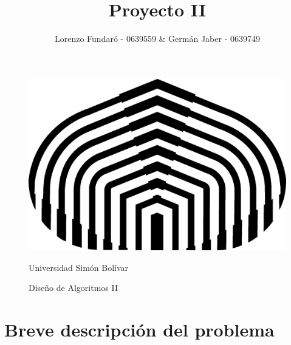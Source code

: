 \documentclass[a4paper,10pt]{article}
\title{Proyecto II}
\author{Lorenzo Fundar\'o - 0639559 \& Germán Jaber - 0639749}
\begin{document}
\begin{figure}[t]
\begin{center}
 \includegraphics[scale = 0.75]{usb.png}
\end{center}

\begin{center}
  \large Universidad Simón Bolívar
\end{center}
\begin{center}
  \large Diseño de Algoritmos II
\end{center}
\end{figure}
\maketitle

\thispagestyle{empty}
\newpage


\tableofcontents{}
\newpage

\section{Breve descripción del problema}
\end{document}
